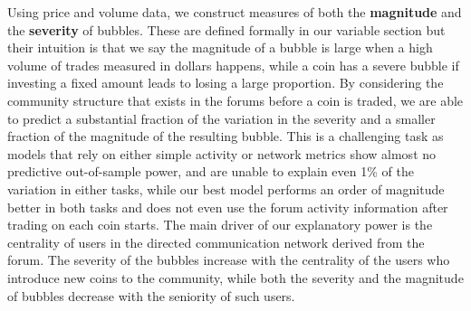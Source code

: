 Using price and volume data, we construct measures of both the \textbf{magnitude} and the \textbf{severity} of bubbles.
These are defined formally in our variable section %
but their intuition is that we say the magnitude of a bubble is large when a high volume of trades measured in dollars happens,
while a coin has a severe bubble if investing a fixed amount leads to losing a large proportion. 
By considering the community structure that exists in the forums before a coin is traded, we are able to predict a substantial fraction of the variation in the severity and a smaller fraction of the magnitude of the resulting bubble.
This is a challenging task as models that rely on either simple activity or network metrics show almost no predictive out-of-sample power, and are unable to explain even 1\% of the variation in either tasks,
while our best model performs an order of magnitude better in both tasks and does not even use the forum activity information after trading on each coin starts. 
The main driver of our explanatory power is the centrality of users in the directed communication network derived from the forum. The severity of the bubbles increase with the centrality of the users who introduce new coins to the community, while both the severity and the magnitude of bubbles decrease with the seniority of such users.



